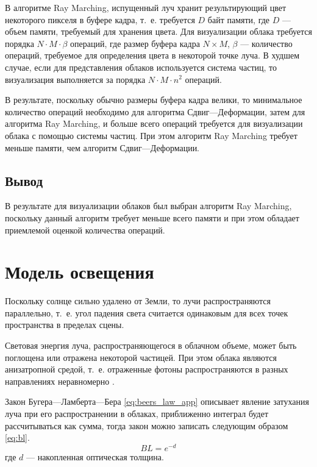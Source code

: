 В алгоритме Ray Marching, испущенный луч хранит результирующий цвет некоторого пикселя в буфере кадра, т.~е. требуется $D$ байт памяти, где $D$ --- объем памяти, требуемый для хранения цвета. Для визуализации облака требуется порядка $N \cdot M \cdot \beta$ операций, где размер буфера кадра $N \times M$, $\beta$ --- количество операций, требуемое для определения цвета в некоторой точке луча. В худшем случае, если для представления облаков используется система частиц, то визуализация выполняется за порядка $N \cdot M \cdot n^2$ операций.

В результате, поскольку обычно размеры буфера кадра велики, то минимальное количество операций необходимо для алгоритма Сдвиг---Деформации, затем для алгоритма Ray Marching, и больше всего операций требуется для визуализации облака с помощью системы частиц. При этом алгоритм Ray Marching требует меньше памяти, чем алгоритм Сдвиг---Деформации.

\subsection*{Вывод}
В результате для визуализации облаков был выбран алгоритм Ray Marching, поскольку данный алгоритм требует меньше всего памяти и при этом обладает приемлемой оценкой количества операций.

\section{Модель освещения}

Поскольку солнце сильно удалено от Земли, то лучи распространяются параллельно, т.~е. угол падения света считается одинаковым для всех точек пространства в пределах сцены.

Световая энергия луча, распространяющегося в облачном объеме, может быть поглощена или отражена некоторой частицей. При этом облака являются анизатропной средой, т.~е. отраженные фотоны распространяются в разных направлениях неравномерно \cite{clouds, partmedia, hzd, frostbite}.

Закон Бугера---Ламберта---Бера \eqref{eq:beers_law_app} описывает явление затухания луча при его распространении в облаках, приближенно интеграл будет рассчитываться как сумма, тогда закон можно записать следующим образом \eqref{eq:bl}.
\begin{equation}
	\label{eq:bl}
	BL = e ^ {-d}
\end{equation}
где $ d $ --- накопленная оптическая толщина.


